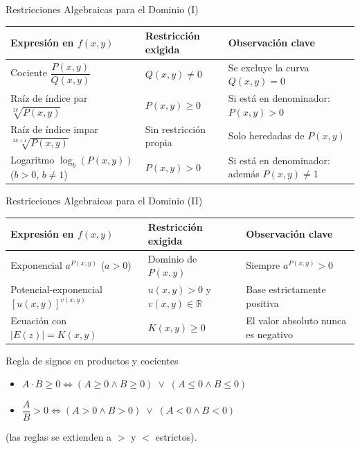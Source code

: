 \documentclass[aspectratio=169,10pt]{beamer}
\begin{document}
\begin{frame}{Restricciones Algebraicas para el Dominio (I)}
  \begin{table}
    \centering
    \setlength{\tabcolsep}{3pt}
    \footnotesize
    \begin{tabular}{p{3.8cm} p{3.6cm} p{4.8cm}}
      \toprule
      \textbf{Expresión en $f(x,y)$} & \textbf{Restricción exigida} & \textbf{Observación clave} \\
      \midrule
      Cociente $\dfrac{P(x,y)}{Q(x,y)}$ & $Q(x,y) \neq 0$ & Se excluye la curva $Q(x,y)=0$ \\
      \addlinespace
      Raíz de índice par $\sqrt[2k]{P(x,y)}$ & $P(x,y) \ge 0$ & Si está en denominador: $P(x,y) > 0$ \\
      \addlinespace
      Raíz de índice impar $\sqrt[2k+1]{P(x,y)}$ & Sin restricción propia & Solo heredadas de $P(x,y)$ \\
      \addlinespace
      Logaritmo $\log_b(P(x,y))$ \newline ($b>0$, $b\neq 1$) & $P(x,y) > 0$ & Si está en denominador: además $P(x,y) \neq 1$ \\
      \bottomrule
    \end{tabular}
  \end{table}
  \vfill
\end{frame}

\begin{frame}{Restricciones Algebraicas para el Dominio (II)}
  \begin{table}
    \centering
    \setlength{\tabcolsep}{3pt}
    \footnotesize
    \begin{tabular}{p{3.8cm} p{3.6cm} p{4.8cm}}
      \toprule
      \textbf{Expresión en $f(x,y)$} & \textbf{Restricción exigida} & \textbf{Observación clave} \\
      \midrule
      Exponencial $a^{P(x,y)}$ ($a>0$) & Dominio de $P(x,y)$ & Siempre $a^{P(x,y)} > 0$ \\
      \addlinespace
      Potencial-exponencial \newline $[u(x,y)]^{v(x,y)}$ & $u(x,y) > 0$ y $v(x,y) \in \mathbb{R}$ & Base estrictamente positiva \\
      \addlinespace
      Ecuación con $|E(z)| = K(x,y)$ & $K(x,y) \ge 0$ & El valor absoluto nunca es negativo \\
      \bottomrule
    \end{tabular}
  \end{table}

  \vspace{0.25cm}
  \begin{block}{Regla de signos en productos y cocientes}
    \begin{itemize}
      \item $A \cdot B \ge 0 \iff (A \ge 0 \wedge B \ge 0) \;\vee\; (A \le 0 \wedge B \le 0)$
      \item $\dfrac{A}{B} > 0 \iff (A > 0 \wedge B > 0) \;\vee\; (A < 0 \wedge B < 0)$
    \end{itemize}
    (las reglas se extienden a $>$ y $<$ estrictos).
  \end{block}
\end{frame}
\end{document}
